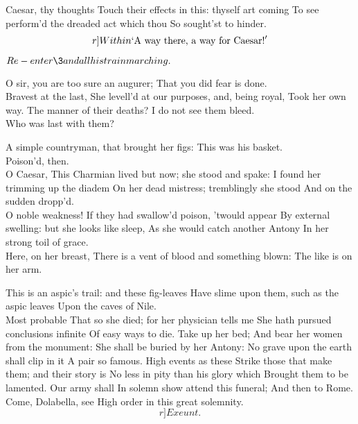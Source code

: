 \documentclass{book}
\begin{document}

	Caesar, thy thoughts
	Touch their effects in this: thyself art coming
	To see perform'd the dreaded act which thou
	So sought'st to hinder.
	\[r]Within  `\textup{A way there, a way for Caesar!}'\]

	\(Re-enter \3 and all his train marching.\)

	O sir, you are too sure an augurer;
	That you did fear is done. \\

\3	Bravest at the last,
	She levell'd at our purposes, and, being royal,
	Took her own way. The manner of their deaths?
	I do not see them bleed. \\

	Who was last with them?

	A simple countryman, that brought her figs:
	This was his basket. \\

\3	Poison'd, then. \\

	O Caesar,
	This Charmian lived but now; she stood and spake:
	I found her trimming up the diadem
	On her dead mistress; tremblingly she stood
	And on the sudden dropp'd. \\

\3	O noble weakness!
	If they had swallow'd poison, 'twould appear
	By external swelling: but she looks like sleep,
	As she would catch another Antony
	In her strong toil of grace. \\

	Here, on her breast,
	There is a vent of blood and something blown:
	The like is on her arm.

	This is an aspic's trail: and these fig-leaves
	Have slime upon them, such as the aspic leaves
	Upon the caves of Nile. \\

\3	Most probable
	That so she died; for her physician tells me
	She hath pursued conclusions infinite
	Of easy ways to die. Take up her bed;
	And bear her women from the monument:
        She shall be buried by her Antony: 
	No grave upon the earth shall clip in it
	A pair so famous. High events as these
	Strike those that make them; and their story is
	No less in pity than his glory which
	Brought them to be lamented. Our army shall
	In solemn show attend this funeral;
	And then to Rome. Come, Dolabella, see
	High order in this great solemnity. \[r]Exeunt.\]

\endVersus
\endDrama
\end{document}
